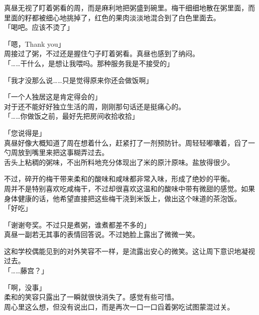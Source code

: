 真昼无视了盯着粥看的周，而是麻利地把粥盛到碗里。梅干细细地散在粥里面，而里面的籽都被细心地挑掉了，红色的果肉淡淡地混合到了白色里面去。\\

「喝吧。应该不烫了」

「嗯，Thank you」\\

周接过了粥，不过还是握住勺子盯着粥看。真昼也感到了纳闷。\\

「……干什么，是想让我喂吗。那种服务我是不接受的」

「我才没那么说……只是觉得原来你还会做饭啊」

「一个人独居这是肯定得会的」\\

对于还不能好好独立生活的周，刚刚那句话还是挺痛心的。\\

「……你做饭之前，最好先把房间收拾收拾」

「您说得是」\\

真昼好像大概知道了周在想着什么，赶紧打了一剂预防针。周轻轻嘟囔着，舀了一勺周放到嘴里来把这事糊弄过去。\\

舌头上粘稠的粥味，不出所料地充分体现出了米的原汁原味。盐放得很少。

不过，碎开的梅干带来柔和的酸味和咸味都非常入味，形成了绝妙的平衡。\\

周并不是特别喜欢吃咸梅干，不过却很喜欢这温和的酸味中带有微甜的感觉。如果身体健康的话，他希望直接把这些梅干浇到米饭上，做出这个味道的茶泡饭。\\

「好吃」

「谢谢夸奖。不过只是煮粥，谁煮都差不多的」\\

真昼一副若无其事的表情回答说。不过她脸上露出了微微一笑。

这和学校偶能见到的对外笑容不一样，是流露出安心的微笑。这让周下意识地凝视过去。\\

「……藤宫？」

「啊，没事」\\

柔和的笑容只露出了一瞬就很快消失了。感觉有些可惜。\\

周心里这么想，但没有说出口，而是再次一口一口舀着粥吃试图蒙混过关。
